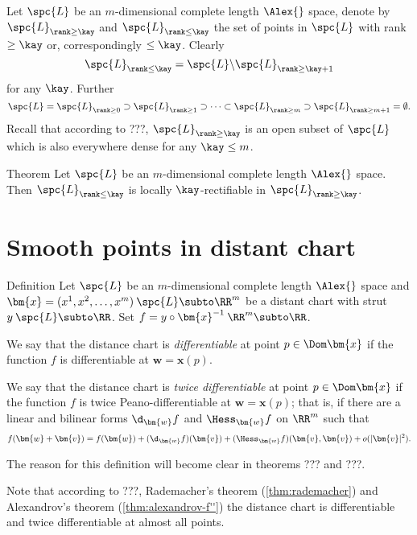 Let  $\spc{L}$ be an $m$-dimensional complete length $\Alex{}$ space,
denote by $\spc{L}_{\rank\ge\kay}$ and $\spc{L}_{\rank\le\kay}$ the set of points in $\spc{L}$
with rank $\ge\kay$ or, correspondingly $\le \kay$.
Clearly 
\[\spc{L}_{\rank\le\kay}=\spc{L}\backslash\spc{L}_{\rank\ge\kay+1}\]
for any $\kay$.
Further
\[\spc{L}
=
\spc{L}_{\rank\ge0}\supset\spc{L}_{\rank\ge1}\supset\dots\subset\spc{L}_{\rank\ge m}\supset\spc{L}_{\rank\ge m+1}=\emptyset.
\]
Recall that according to ???, $\spc{L}_{\rank\ge\kay}$ is an open subset of $\spc{L}$ which is also everywhere dense for any $\kay\le m$.

\begin{thm}{Theorem}\label{thm:rank+rect}
Let  $\spc{L}$ be an $m$-dimensional complete length $\Alex{}$ space.
Then $\spc{L}_{\rank\le\kay}$ is locally $\kay$-rectifiable in $\spc{L}_{\rank\ge\kay}$.
\end{thm}







\section{Smooth points in distant chart}

\begin{thm}{Definition}
Let $\spc{L}$ be an $m$-dimensional complete length $\Alex{}$ space
and $\bm{x}=(x^1,x^2,\dots,x^m)\:\spc{L}\subto\RR^m$ be a distant chart with strut $y\:\spc{L}\subto\RR$.
Set $f=y\circ\bm{x}^{-1}\:\RR^m\subto \RR$.

We say that the distance chart is 
\emph{differentiable} at 
point $p\in\Dom\bm{x}$ 
if the function $f$ is differentiable at $\bm{w}=\bm{x}(p)$.

We say that the distance chart is 
\emph{twice differentiable} at 
point $p\in\Dom\bm{x}$ 
if the function $f$ is twice Peano-differentiable at $\bm{w}=\bm{x}(p)$;
that is, if there are a linear and bilinear forms 
$\d_{\bm{w}}f$ 
and 
$\Hess_{\bm{w}}f$
on $\RR^m$ such that
\[f(\bm{w}+\bm{v})
=
f(\bm{w})
+
(\d_{\bm{w}}f)(\bm{v})
+
(\Hess_{\bm{w}}f)(\bm{v},\bm{v})
+
o(|\bm{v}|^2).
\]

\end{thm}

The reason for this definition will become clear in theorems ??? and ???.

Note that according to ???, 
Rademacher's theorem (\ref{thm:rademacher}) 
and Alexandrov's theorem (\ref{thm:alexandrov-f''})
the distance chart is differentiable and twice differentiable at 
almost all points.




